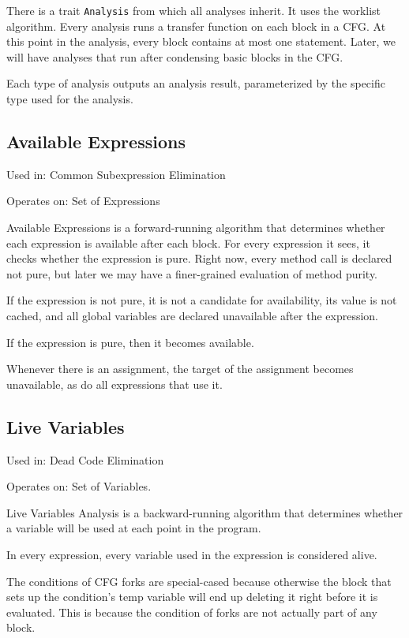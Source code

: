 \documentclass[11pt]{article}
\begin{document}
  There is a trait \verb~Analysis~ from which all analyses inherit. It uses the worklist algorithm.
  Every analysis runs a transfer function on each block in a CFG. At this point in the analysis,
  every block contains at most one statement. Later, we will have analyses that run after condensing
  basic blocks in the CFG.

  Each type of analysis outputs an analysis result, parameterized by the specific type used for the analysis.
\subsection{Available Expressions}
\label{sec-2-1}

  Used in: Common Subexpression Elimination

  Operates on: Set of Expressions

  Available Expressions is a forward-running algorithm that determines whether each expression is available
  after each block. For every expression it sees, it checks whether the expression is pure. Right now, 
  every method call is declared not pure, but later we may have a finer-grained evaluation of method purity.

  If the expression is not pure, it is not a candidate for availability, its value is not cached, and all
  global variables are declared unavailable after the expression.

  If the expression is pure, then it becomes available.

  Whenever there is an assignment, the target of the assignment becomes unavailable, as do all expressions
  that use it.
\subsection{Live Variables}
\label{sec-2-2}

  Used in: Dead Code Elimination

  Operates on: Set of Variables.

  Live Variables Analysis is a backward-running algorithm that determines whether a variable will be used
  at each point in the program. 

  In every expression, every variable used in the expression is considered alive.

  The conditions of CFG forks are special-cased because otherwise the block that sets up the condition's
  temp variable will end up deleting it right before it is evaluated. This is because the condition of forks
  are not actually part of any block.
\end{document}
